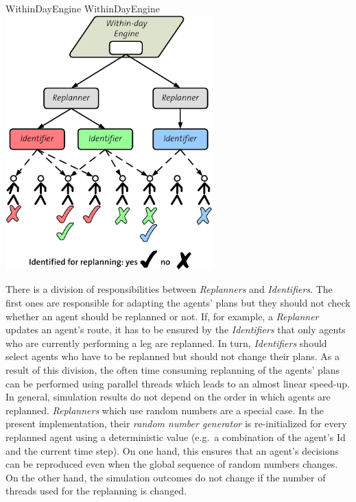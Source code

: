 \createfigure%
{WithinDayEngine}%
{WithinDayEngine}%
{\label{fig:labelWithinDayEngine}}%
{\includegraphics[width=8.0cm, angle=0]{extending/figures/WithinDayReplanning/ReplanningManager}}%
{}


There is a division of responsibilities between \emph{Replanners} and \emph{Identifiers}. The first ones are responsible for adapting the agents' plans but they should not check whether an agent should be replanned or not. If, for example, a \emph{Replanner} updates an agent's route, it has to be ensured by the \emph{Identifiers} that only agents who are currently performing a leg are replanned. In turn, \emph{Identifiers} should select agents who have to be replanned but should not change their plans. As a result of this division, the often time consuming replanning of the agents' plans can be performed using parallel threads which leads to an almost linear speed-up. In general, simulation results do not depend on the order in which agents are replanned. \emph{Replanners} which use random numbers are a special case. 
In the present implementation, their \emph{random number generator} is re-initialized for every replanned agent using a deterministic value (e.g.~a combination of the agent's Id and the current time step). On one hand, this ensures that an agent's decisions can be reproduced even when the global sequence of random numbers changes. On the other hand, the simulation outcomes do not change if the number of threads used for the replanning is changed.

